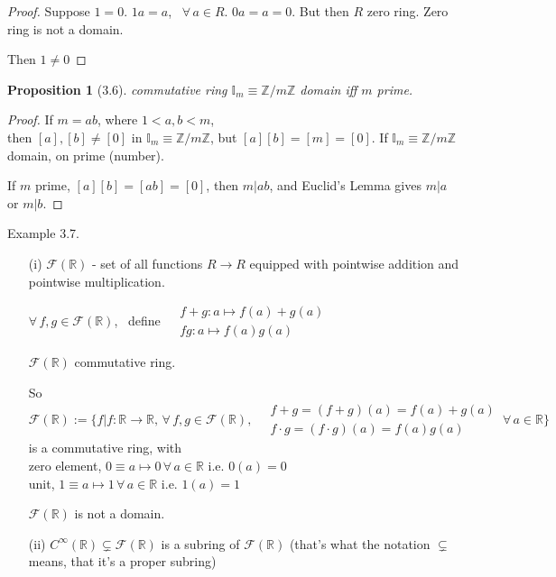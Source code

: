 \documentclass[twoside,landscape]{amsart}
\theoremstyle{plain}
\newtheorem{proposition}{Proposition}
\theoremstyle{definition}
\theoremstyle{remark}
\begin{document}
\begin{multicols*}{2}
\begin{proof}
Suppose $1=0$.  $1a = a$, \, $\forall \, a \in R$.  $0a =a=0$.  But then $R$ zero ring.  Zero ring is not a domain.  

Then $1\neq 0$
\end{proof}

\begin{proposition}[3.6]
  commutative ring $\mathbb{I}_m \equiv \mathbb{Z}/m\mathbb{Z}$ domain iff $m$ prime.
  \end{proposition}

\begin{proof}
  If $m=ab$, where $1<a,b<m$, \\
  then $[a],[b]\neq [0]$ in $\mathbb{I}_m \equiv \mathbb{Z}/m\mathbb{Z}$, but $[a][b] = [m]=[0]$.  If $\mathbb{I}_m \equiv \mathbb{Z}/m\mathbb{Z}$ domain, on prime (number).

  If $m$ prime, $[a][b]=[ab] =[0]$, then $m | ab$, and Euclid's Lemma gives $m|a$ or $m|b$.

  
  \end{proof}

Example 3.7. 
\begin{enumerate}
\item[(i)] $\mathcal{F}(\mathbb{R})$ - set of all functions $R \to R$ equipped with pointwise addition and pointwise multiplication.  

$\forall\, f, g \in \mathcal{F}(\mathbb{R})$, \, define  $\begin{aligned}
  & f+ g : a \mapsto f(a) + g(a) \\ 
  & fg : a \mapsto f(a) g(a) \end{aligned}$ 

$\mathcal{F}(\mathbb{R})$ commutative ring.  

So
\[
\mathcal{F}(\mathbb{R}) := \lbrace f | f: \mathbb{R} \to \mathbb{R}, \, \forall \, f,g \in \mathcal{F}(\mathbb{R}), \, \begin{aligned} & f+g = (f+g)(a) = f(a)+g(a) \\
  & f\cdot g = (f\cdot g)(a) = f(a)g(a) \end{aligned} \, \forall \, a \in \mathbb{R} \rbrace
\]
is a commutative ring, with \\
zero element, $0 \equiv a \mapsto 0 \, \forall \, a \in \mathbb{R}$ i.e. $0(a)=0$ \\
unit, $1 \equiv a \mapsto 1 \, \forall \, a \in \mathbb{R}$ i.e. $1(a) = 1$

$\mathcal{F}(\mathbb{R})$ is not a domain.  

\item[(ii)] $C^{\infty}(\mathbb{R}) \subsetneq \mathcal{F}(\mathbb{R})$ is a subring of $\mathcal{F}(\mathbb{R})$ (that's what the notation $\subsetneq$ means, that it's a proper subring)
\end{enumerate}



\end{multicols*}
\end{document}

